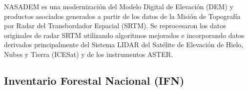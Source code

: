 NASADEM \cite{nasadem_data} es una modernización del Modelo Digital de Elevación (DEM) y productos asociados generados a partir de los datos de la Misión de Topografía por Radar del Transbordador Espacial (SRTM). Se reprocesaron los datos originales de radar SRTM utilizando algoritmos mejorados e incorporando datos derivados principalmente del Sistema LIDAR del Satélite de Elevación de Hielo, Nubes y Tierra (ICESat) y de los instrumentos ASTER. 

\begin{table}[H]
    \renewcommand{\arraystretch}{2.5} %
    
    \centering
    \caption{Columnas empleadas de los datasets de NASADEM}
    \label{tab:nasadem}
\end{table}

\subsection{Inventario Forestal Nacional (IFN)}\label{section:tablas_ifn}



